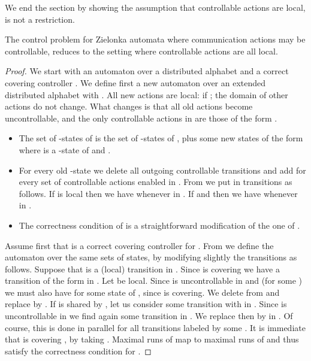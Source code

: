 \documentclass[10pt,a4paper]{article}
\begin{document}
We end the section by showing the assumption that controllable
actions are local, is not a restriction.

\begin{proposition}\label{prop:comm_controllable}
  The control problem for Zielonka automata where communication
  actions may be controllable, reduces to the setting where
  controllable actions are all local.
\end{proposition}

\begin{proof}
  We start with an automaton  over a distributed alphabet
   and a correct covering controller .  We
  define first a new automaton  over an extended distributed
  alphabet  with . All new actions
  are local:  if ; the
  domain of other actions do not change. What changes is that all old
  actions become uncontrollable, and the only controllable actions in
   are those of the form .

  \begin{itemize}
  \item The set of -states of  is the set of -states of ,
    plus some new states of the form  where  is a
    -state of  and . 
\item For every old -state  we delete all outgoing
  controllable transitions and add
   for every set  of
  controllable actions enabled in . From  we put in  
  transitions as follows. If  is local then we
  have  whenever
   in . If  and
   then we have  whenever  in .
\item The correctness condition of  is a straightforward
  modification of the one of . 

\end{itemize}

  Assume first that  is a correct covering controller for
  . From  we define the automaton  over the same sets
  of states, by modifying slightly the transitions as follows. Suppose
  that  is a (local) transition in . Since
   is covering we have a transition of the form  in . Let  be
  local. Since  is uncontrollable in  and  (for some ) we must also have  for
  some state  of , since  is covering. We delete  from  and replace  by . If  is shared by , let us consider some transition  with  in . Since  is
  uncontrollable in  we find again some transition
   in . We replace then  by  in . Of course, this is done
  in parallel for all transitions labeled by some . It is
  immediate that  is covering , by taking
  . Maximal runs of  map to maximal runs of  and
  thus satisfy the correctness condition for .


\end{proof}
\end{document}
